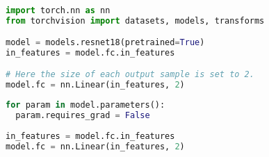 \begin{lstlisting}[language=Python,caption={Using pretrained ResNet18},captionpos=b]

import torch.nn as nn
from torchvision import datasets, models, transforms

model = models.resnet18(pretrained=True)
in_features = model.fc.in_features

# Here the size of each output sample is set to 2.
model.fc = nn.Linear(in_features, 2)

\end{lstlisting}

\begin{lstlisting}[language=Python,caption={Freezing model parameters},captionpos=b]
for param in model.parameters():
  param.requires_grad = False
  
in_features = model.fc.in_features
model.fc = nn.Linear(in_features, 2)
\end{lstlisting}
